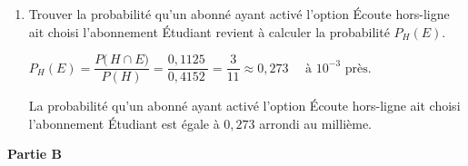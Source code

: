 \documentclass[10pt]{article}
\providecommand{\np}[2][]{{#2~#1}}
\begin{document}
\begin{enumerate}
\quad $P(H) = P\big(\,E\cap H\big) + P\big(\,C\cap H\big) + P\big(\,F\cap H\big) $

D'où :\quad $\begin{aligned}[t] P(H)& = 0,1125 + P(C) \times P_C(H) +P\big(\,F\cap H\big) \\
			& = \np{0,1125} + 0,6 \times 0,3 + 0,12\\
			&= \np{0,1125} + 0,18 + 0,12\\
			& = \np{0,4125}
		\end{aligned} $

La probabilité qu'un abonné ait activé l'option \og Écoute hors-ligne\fg{} est bien de \np{0,4125}.
\item Trouver la probabilité qu'un abonné ayant activé l'option \og Écoute hors-ligne\fg{} ait choisi l'abonnement \og Étudiant\fg{} revient à calculer la probabilité $P_H(E)$.

$P_H(E)=\dfrac{P\big(\,H\cap E\big)}{P(H)}= \dfrac{\np{0,1125}}{\np{0,4152}} = \dfrac{3}{11} \approx 0,273 \quad\text{ à }10^{-3} \text{ près.}$

La probabilité qu'un abonné ayant activé l'option \og Écoute hors-ligne\fg{} ait choisi l'abonnement \og Étudiant\fg{} est égale à $0,273$ arrondi au millième.
\end{enumerate}

\textbf{Partie B}
\end{document}
